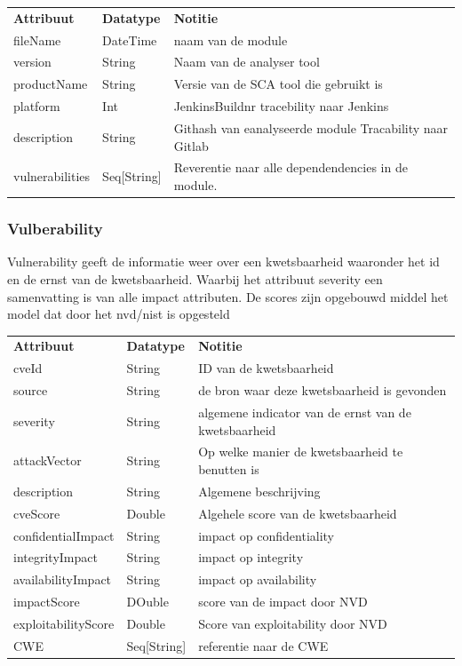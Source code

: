 \begin{tabular}{lll}
    \textbf{Attribuut} & \textbf{Datatype} & \textbf{Notitie}\\
    fileName & DateTime & naam van de module\\
    version & String & Naam van de analyser tool\\
    productName & String & Versie van de SCA tool die gebruikt is\\
    platform & Int & JenkinsBuildnr tracebility naar Jenkins\\
    description & String & Githash van  eanalyseerde module Tracability naar Gitlab\\
    vulnerabilities & Seq[String] & Reverentie naar alle dependendencies in de module.\\
\end{tabular}

\subsubsection{Vulberability}\label{subsubsec:vulberability}
Vulnerability geeft de informatie weer over een kwetsbaarheid waaronder het id en de ernst van de kwetsbaarheid. Waarbij het attribuut severity een samenvatting is van alle impact attributen.  De scores zijn opgebouwd middel het model dat door het nvd/nist is opgesteld

\begin{tabular}{lll}
    \textbf{Attribuut} & \textbf{Datatype} & \textbf{Notitie}\\

    cveId & String & ID van de kwetsbaarheid\\
    source & String & de bron waar deze kwetsbaarheid is gevonden\\
    severity & String & algemene indicator van de ernst van de kwetsbaarheid \\
    attackVector & String & Op welke manier de kwetsbaarheid te benutten is\\
    description & String & Algemene beschrijving\\
    cveScore & Double & Algehele score van de kwetsbaarheid\\
    confidentialImpact & String & impact op confidentiality\\
    integrityImpact & String & impact op integrity \\
    availabilityImpact & String &  impact op availability  \\
    impactScore & DOuble & score van de impact door NVD  \\
    exploitabilityScore & Double & Score van exploitability door NVD  \\
    CWE & Seq[String] & referentie naar de CWE \\
\end{tabular}

